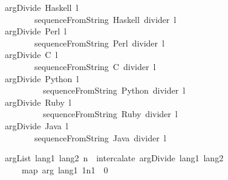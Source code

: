 \documentclass[12pt]{article}
\begin{document}
\begin{tabbing}\ttfamily
~~~argDivide~Haskell~l~~~\\
\ttfamily ~~~~~~~~~~sequenceFromString~Haskell~divider~l~~\\
\ttfamily ~~~argDivide~Perl~l~~~~~~~~~\\
\ttfamily ~~~~~~~~~~sequenceFromString~Perl~divider~l~~\\
\ttfamily ~~~argDivide~C~l~~~~~~~\\
\ttfamily ~~~~~~~~~~sequenceFromString~C~divider~l\\
\ttfamily ~~~argDivide~Python~l~~\\
\ttfamily ~~~~~~~~~~~~sequenceFromString~Python~divider~l~~\\
\ttfamily ~~~argDivide~Ruby~l~~~~\\
\ttfamily ~~~~~~~~~~~~sequenceFromString~Ruby~divider~l~~\\
\ttfamily ~~~argDivide~Java~l~~~~\\
\ttfamily ~~~~~~~~~~sequenceFromString~Java~divider~l
\end{tabbing}
\begin{tabbing}\ttfamily
~~~argList~lang1~lang2~n~~intercalate~argDivide~lang1~lang2~\\
\ttfamily ~~~~~~~map~arg~lang1~1n1~~0
\end{tabbing}
\end{document}
